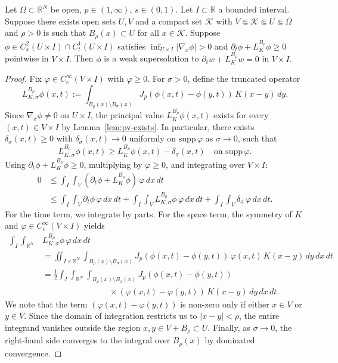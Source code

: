 \documentclass[11pt, a4paper, twoside]{article}
\theoremstyle{definition}
\theoremstyle{remark}
\newcommand{\R}{\mathbb{R}}
\begin{document}
\begin{lemma}\label{lem:parabolic-L310}
Let $\Omega \subset \R^N$ be open, $p \in (1,\infty)$,
$s \in (0,1)$. Let $I \subset \R$ a bounded interval. Suppose there exists
open sets $U,V$ and a compact set $\mathcal{K} $ with $V \Subset \mathcal{K} \Subset U \Subset \Omega$ and $\rho > 0$ is such that
$B_\rho(x) \subset U$ for all $x \in \mathcal{K}$.
Suppose
$\phi \in C^2_x(U \times I) \cap C^1_t(U \times I)$
satisfies $\inf_{U \times I}|\nabla_x\phi| > 0$ and
$\partial_t\phi + L_K^{B_\rho}\phi \ge 0$ pointwise in
$V \times I$. Then $\phi$ is a weak supersolution to
$\partial_t w + L_K^{B_\rho} w = 0$ in $V \times I$.
\end{lemma}

\begin{proof}
Fix $\varphi \in C^\infty_c(V \times I)$ with
$\varphi \ge 0$. For $\sigma > 0$, define the truncated
operator
\[
  L_{K,\sigma}^{B_\rho}\phi(x,t)
  := \int_{B_\rho(x) \setminus B_\sigma(x)}
     J_p(\phi(x,t)-\phi(y,t))\,K(x-y)\,dy.
\]
Since $\nabla_x\phi \neq 0$ on $U \times I$, the
principal value $L_K^{B_\rho}\phi(x,t)$ exists for every
$(x,t) \in V \times I$ by Lemma~\ref{lem:pv-exists}.
In particular, there exists $\delta_\sigma(x,t) \ge 0$ with
$\delta_\sigma(x,t) \to 0$ uniformly on $\mathrm{supp}\,\varphi$
as $\sigma \to 0$, such that
\[
  L_{K,\sigma}^{B_\rho}\phi(x,t)
  \ge L_K^{B_\rho}\phi(x,t) - \delta_\sigma(x,t)
  \quad \text{on } \mathrm{supp}\,\varphi.
\]
Using $\partial_t\phi + L_K^{B_\rho}\phi \ge 0$,
multiplying by $\varphi \ge 0$, and integrating over
$V \times I$:
\begin{align*}
  0 &\le \int_I\int_V
    (\partial_t\phi + L_K^{B_\rho}\phi)\,\varphi\,dx\,dt \\
  &\le \int_I\int_V \partial_t\phi\,\varphi\,dx\,dt
    + \int_I\int_V L_{K,\sigma}^{B_\rho}\phi\,\varphi\,dx\,dt
    + \int_I\int_V \delta_\sigma\,\varphi\,dx\,dt.
\end{align*}
For the time term, we integrate by parts. For the space term, the symmetry of $K$ and $\varphi \in C^\infty_c(V \times I)$ yields
\begin{align*}
  \int_I\int_{\R^N} &L_{K,\sigma}^{B_\rho}\phi\,\varphi\,dx\,dt \\
  &= \iint_{I \times \R^N} \int_{B_\rho(x) \setminus B_\sigma(x)}
    J_p(\phi(x,t)-\phi(y,t))\,\varphi(x,t)\,K(x-y)\,dy\,dx\,dt \\
  &= \frac{1}{2}\int_I\int_{\R^N} \int_{B_\rho(x) \setminus B_\sigma(x)}
    J_p(\phi(x,t)-\phi(y,t)) \\
  &\qquad\qquad\qquad\qquad\times
    (\varphi(x,t)-\varphi(y,t))\,K(x-y)\,dy\,dx\,dt.
\end{align*}
We note that the term $(\varphi(x,t)-\varphi(y,t))$ is non-zero only if either $x \in V$ or $y \in V$. Since the domain of integration restricts us to $|x-y| < \rho$, the entire integrand vanishes outside the region $x,y \in V + B_\rho \subset U$. Finally, as $\sigma \to 0$, the right-hand side converges to the integral over $B_\rho(x)$ by dominated convergence. 


\end{proof}
\end{document}
